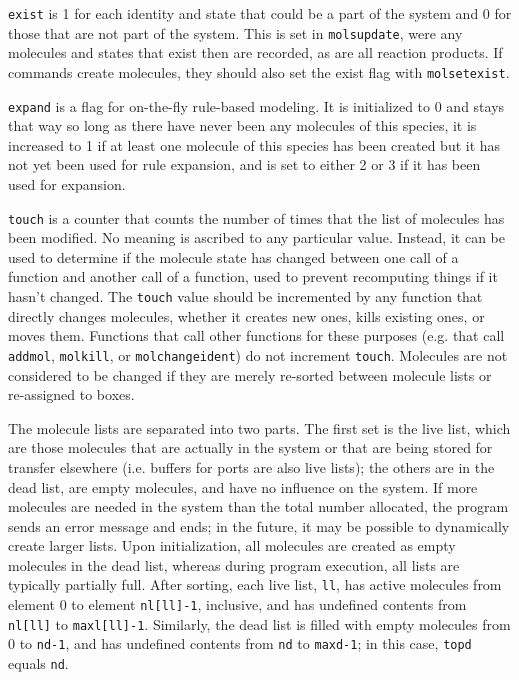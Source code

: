 \documentclass {book}
\begin{document}
\texttt{exist} is 1 for each identity and state that could be a part of the system and 0 for those that are not part of the system. This is set in \texttt{molsupdate}, were any molecules and states that exist then are recorded, as are all reaction products. If commands create molecules, they should also set the exist flag with \texttt{molsetexist}.

\texttt{expand} is a flag for on-the-fly rule-based modeling. It is initialized to 0 and stays that way so long as there have never been any molecules of this species, it is increased to 1 if at least one molecule of this species has been created but it has not yet been used for rule expansion, and is set to either 2 or 3 if it has been used for expansion.

\texttt{touch} is a counter that counts the number of times that the list of molecules has been modified. No meaning is ascribed to any particular value. Instead, it can be used to determine if the molecule state has changed between one call of a function and another call of a function, used to prevent recomputing things if it hasn't changed. The \texttt{touch} value should be incremented by any function that directly changes molecules, whether it creates new ones, kills existing ones, or moves them. Functions that call other functions for these purposes (e.g. that call \texttt{addmol}, \texttt{molkill}, or \texttt{molchangeident}) do not increment \texttt{touch}. Molecules are not considered to be changed if they are merely re-sorted between molecule lists or re-assigned to boxes.

The molecule lists are separated into two parts. The first set is the live list, which are those molecules that are actually in the system or that are being stored for transfer elsewhere (i.e. buffers for ports are also live lists); the others are in the dead list, are empty molecules, and have no influence on the system. If more molecules are needed in the system than the total number allocated, the program sends an error message and ends; in the future, it may be possible to dynamically create larger lists. Upon initialization, all molecules are created as empty molecules in the dead list, whereas during program execution, all lists are typically partially full. After sorting, each live list, \texttt{ll}, has active molecules from element 0 to element \texttt{nl[ll]-1}, inclusive, and has undefined contents from \texttt{nl[ll]} to \texttt{maxl[ll]-1}. Similarly, the dead list is filled with empty molecules from 0 to \texttt{nd-1}, and has undefined contents from \texttt{nd} to \texttt{maxd-1}; in this case, \texttt{topd} equals \texttt{nd}.
\end{document}
